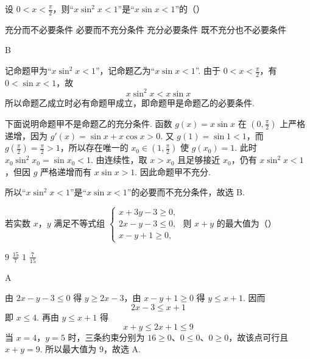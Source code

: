 \begin{problem}
设 \(0 < x < \frac{\pi}{2}\)，则“\(x \sin^2 x < 1\)”是“\(x \sin x < 1\)”的（\quad）

\choices
    {充分而不必要条件}
    {必要而不充分条件}
    {充分必要条件}
    {既不充分也不必要条件}

\begin{answer}
B
\end{answer}

\begin{solution}
记命题甲为“\(x\sin^2x<1\)”，记命题乙为“\(x\sin x<1\)”.
由于 \(0<x<\frac{\pi}{2}\)，有 \(0<\sin x<1\)，故
\[
x\sin^2x<x\sin x
\]
所以命题乙成立时必有命题甲成立，即命题甲是命题乙的必要条件.

下面说明命题甲不是命题乙的充分条件. 函数 \(g(x)=x\sin x\) 在
\(\left(0,\frac{\pi}{2}\right)\) 上严格递增，因为
\(g'(x)=\sin x+x\cos x>0\). 又 \(g(1)=\sin1<1\)，而
\(g\left(\frac{\pi}{2}\right)=\frac{\pi}{2}>1\)，所以存在唯一的
\(x_0\in\left(1,\frac{\pi}{2}\right)\) 使 \(g(x_0)=1\). 此时
\(x_0\sin^2x_0=\sin x_0<1\). 由连续性，取 \(x>x_0\) 且足够接近 \(x_0\)，仍有
\(x\sin^2x<1\)，但因 \(g\) 严格递增而有 \(x\sin x>1\). 因此命题甲不充分.

所以“\(x\sin^2x<1\)”是“\(x\sin x<1\)”的必要而不充分条件，故选 B.
\end{solution}
\end{problem}

\begin{problem}
若实数 \(x\)，\(y\) 满足不等式组 \(\begin{cases}
x + 3y - 3 \geqslant 0,\\
2x - y - 3 \leqslant 0,\\
x - y + 1 \geqslant 0,
\end{cases}\) 则 \(x + y\) 的最大值为（\quad）

\choices
    {\(9\)}
    {\(\frac{15}{7}\)}
    {\(1\)}
    {\(\frac{7}{15}\)}

\begin{answer}
A
\end{answer}

\begin{solution}
由 \(2x-y-3\leqslant0\) 得 \(y\geqslant2x-3\)，由
\(x-y+1\geqslant0\) 得 \(y\leqslant x+1\). 因而
\[
2x-3\leqslant x+1
\]
即 \(x\leqslant4\). 再由 \(y\leqslant x+1\) 得
\[
x+y\leqslant2x+1\leqslant9
\]
当 \(x=4\)，\(y=5\) 时，三条约束分别为 \(16\geqslant0\)、\(0\leqslant0\)、\(0\geqslant0\)，故该点可行且 \(x+y=9\). 所以最大值为 \(9\)，故选 A.
\end{solution}
\end{problem}

